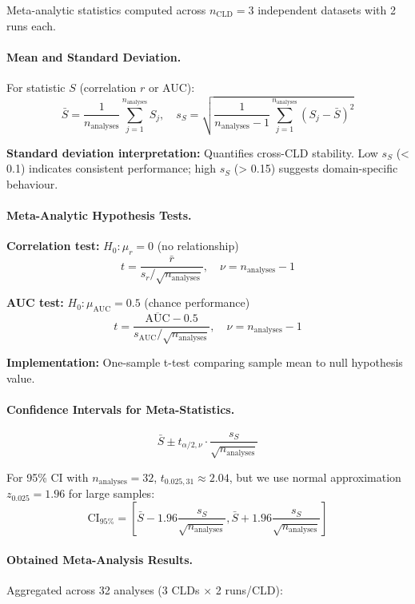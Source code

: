 Meta-analytic statistics computed across \(n_{\text{CLD}} = 3\) independent datasets with 2 runs each.

\paragraph{Mean and Standard Deviation.} For statistic \(S\) (correlation \(r\) or AUC):
\[
\bar{S} = \frac{1}{n_{\text{analyses}}}\sum_{j=1}^{n_{\text{analyses}}} S_j, \quad s_S = \sqrt{\frac{1}{n_{\text{analyses}}-1}\sum_{j=1}^{n_{\text{analyses}}}(S_j - \bar{S})^2}
\]

\textbf{Standard deviation interpretation:} Quantifies cross-CLD stability. Low \(s_S\) (< 0.1) indicates consistent performance; high \(s_S\) (> 0.15) suggests domain-specific behaviour.

\paragraph{Meta-Analytic Hypothesis Tests.}

\textbf{Correlation test:} \(H_0: \mu_r = 0\) (no relationship)
\[
t = \frac{\bar{r}}{s_r / \sqrt{n_{\text{analyses}}}}, \quad \nu = n_{\text{analyses}} - 1
\]

\textbf{AUC test:} \(H_0: \mu_{\text{AUC}} = 0.5\) (chance performance)
\[
t = \frac{\overline{\text{AUC}} - 0.5}{s_{\text{AUC}} / \sqrt{n_{\text{analyses}}}}, \quad \nu = n_{\text{analyses}} - 1
\]

\textbf{Implementation:} One-sample t-test comparing sample mean to null hypothesis value.

\paragraph{Confidence Intervals for Meta-Statistics.}
\[
\bar{S} \pm t_{\alpha/2, \nu} \cdot \frac{s_S}{\sqrt{n_{\text{analyses}}}}
\]

For 95\% CI with \(n_{\text{analyses}} = 32\), \(t_{0.025, 31} \approx 2.04\), but we use normal approximation \(z_{0.025} = 1.96\) for large samples:
\[
\text{CI}_{95\%} = \left[\bar{S} - 1.96\frac{s_S}{\sqrt{n_{\text{analyses}}}}, \bar{S} + 1.96\frac{s_S}{\sqrt{n_{\text{analyses}}}}\right]
\]

\paragraph{Obtained Meta-Analysis Results.} Aggregated across 32 analyses (3 CLDs \(\times\) 2 runs/CLD):

